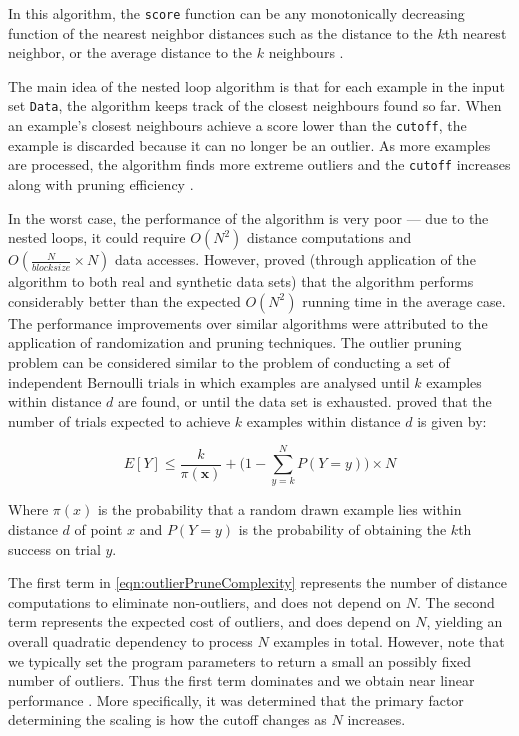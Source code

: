 

In this algorithm, the \verb+score+ function can be any monotonically decreasing
function of the nearest neighbor distances such as the distance to the $k$th
nearest neighbor, or the average distance to the $k$ neighbours \cite{Bay:2003}.

The main idea of the nested loop algorithm is that for each example in the
input set \verb+Data+, the algorithm keeps track of the closest neighbours found
so far. When an example's closest neighbours achieve a score lower than the
\verb+cutoff+, the example is discarded because it can no longer be an outlier.
As more examples are processed, the algorithm finds more extreme outliers and
the \verb+cutoff+ increases along with pruning efficiency \cite{Bay:2003}.

In the worst case, the performance of the algorithm is very poor --- due to the
nested loops, it could require $O(N^{2})$ distance computations and
$O(\frac{N}{blocksize} \times N)$ data accesses. However, \citeauthor{Bay:2003}
proved (through application of the algorithm to both real and synthetic data
sets) that the algorithm performs considerably better than the expected
$O(N^{2})$ running time in the average case. The performance improvements over
similar algorithms were attributed to the application of randomization and
pruning techniques. The outlier pruning problem can be considered similar to the
problem of conducting a set of independent Bernoulli trials in which examples 
are analysed until $k$ examples within distance $d$ are found, or until the data
set is exhausted. \citeauthor{Bay:2003} proved that the number of trials
expected to achieve $k$ examples within distance $d$ is given by:

\begin{equation}
\label{eqn:outlierPruneComplexity}
E[Y] \leq \frac{k}{\pi(\textbf{x})} + \Bigg(1 - \sum_{y=k}^{N} P(Y=y)\Bigg) \times N
\end{equation}

Where $\pi(x)$ is the probability that a random drawn example lies within 
distance $d$ of point $x$ and $P(Y=y)$ is the probability of obtaining the $k$th
success on trial $y$.

The first term in \autoref{eqn:outlierPruneComplexity} represents the number of
distance computations to eliminate non-outliers, and does not depend on $N$. The
second term represents the expected cost of outliers, and does depend on $N$,
yielding an overall quadratic dependency to process $N$ examples in total.
However, note that we typically set the program parameters to return a small an
possibly fixed number of outliers. Thus the first term dominates and we obtain
near linear performance \cite{Bay:2003}. More specifically, it was determined
that the primary factor determining the scaling is how the cutoff changes as $N$
increases.

